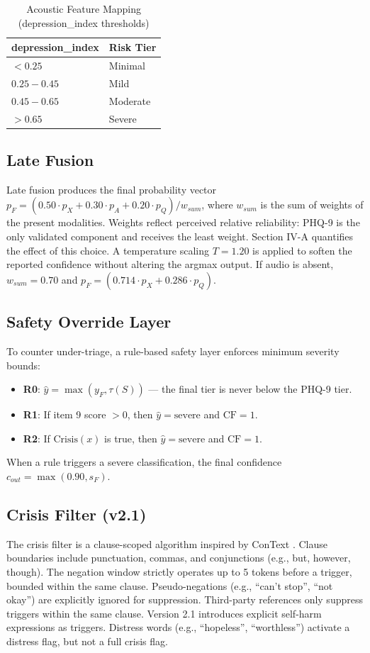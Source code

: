 \documentclass[conference]{IEEEtran}
\begin{document}
\begin{table}[htbp]
\caption{Acoustic Feature Mapping (depression\_index thresholds)}
\label{tab:audio_map}
\centering
\begin{tabular}{ll}
\toprule
\textbf{depression\_index} & \textbf{Risk Tier} \\
\midrule
$< 0.25$ & Minimal \\
$0.25 - 0.45$ & Mild \\
$0.45 - 0.65$ & Moderate \\
$> 0.65$ & Severe \\
\bottomrule
\end{tabular}
\end{table}

\subsection{Late Fusion}
Late fusion produces the final probability vector $p_F = (0.50 \cdot p_X + 0.30 \cdot p_A + 0.20 \cdot p_Q) / w_{sum}$, where $w_{sum}$ is the sum of weights of the present modalities. Weights reflect perceived relative reliability: PHQ-9 is the only validated component and receives the least weight. Section IV-A quantifies the effect of this choice. A temperature scaling $T=1.20$ \cite{guo_calibration} is applied to soften the reported confidence without altering the argmax output. If audio is absent, $w_{sum}=0.70$ and $p_F = (0.714 \cdot p_X + 0.286 \cdot p_Q)$.

\subsection{Safety Override Layer}
To counter under-triage, a rule-based safety layer enforces minimum severity bounds:
\begin{itemize}
    \item \textbf{R0}: $\hat{y} = \max(y_F, \tau(S))$ — the final tier is never below the PHQ-9 tier.
    \item \textbf{R1}: If item 9 score $>0$, then $\hat{y} = \text{severe}$ and $\text{CF}=1$.
    \item \textbf{R2}: If $\text{Crisis}(x)$ is true, then $\hat{y} = \text{severe}$ and $\text{CF}=1$.
\end{itemize}
When a rule triggers a severe classification, the final confidence $c_{out} = \max(0.90, s_F)$.

\subsection{Crisis Filter (v2.1)}
The crisis filter is a clause-scoped algorithm inspired by ConText \cite{harkema_context}. Clause boundaries include punctuation, commas, and conjunctions (e.g., but, however, though). The negation window strictly operates up to 5 tokens before a trigger, bounded within the same clause. Pseudo-negations (e.g., ``can't stop'', ``not okay'') are explicitly ignored for suppression. Third-party references only suppress triggers within the same clause. Version 2.1 introduces explicit self-harm expressions as triggers. Distress words (e.g., ``hopeless'', ``worthless'') activate a distress flag, but not a full crisis flag.
\end{document}
